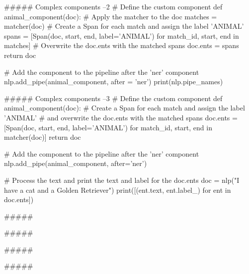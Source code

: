 ##### Complex components --2
# Define the custom component
def animal_component(doc):
    # Apply the matcher to the doc
    matches = matcher(doc)
    # Create a Span for each match and assign the label 'ANIMAL'
    spans = [Span(doc, start, end, label='ANIMAL')
             for match_id, start, end in matches]
    # Overwrite the doc.ents with the matched spans
    doc.ents = spans
    return doc

# Add the component to the pipeline after the 'ner' component 
nlp.add_pipe(animal_component, after = 'ner')
print(nlp.pipe_names)



#####  Complex components --3
# Define the custom component
def animal_component(doc):
    # Create a Span for each match and assign the label 'ANIMAL'
    # and overwrite the doc.ents with the matched spans
    doc.ents = [Span(doc, start, end, label='ANIMAL')
                for match_id, start, end in matcher(doc)]
    return doc
    
# Add the component to the pipeline after the 'ner' component 
nlp.add_pipe(animal_component, after='ner')

# Process the text and print the text and label for the doc.ents
doc = nlp("I have a cat and a Golden Retriever")
print([(ent.text, ent.label_) for ent in doc.ents])



#####




#####




#####




#####




